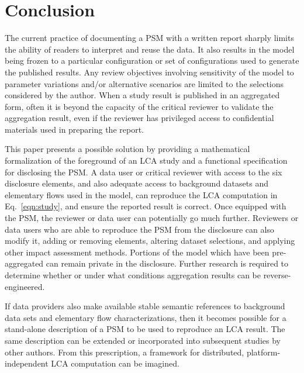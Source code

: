 \section{Conclusion} 

The current practice of documenting a PSM with a written report sharply limits the ability of readers to interpret and reuse the data.  It also results in the model being frozen to a particular configuration or set of configurations used to generate the published results.  Any review objectives involving sensitivity of the model to parameter variations and/or alternative scenarios are limited to the selections considered by the author.
When a study result is published in an aggregated form, often it is beyond the capacity of the critical reviewer to validate the aggregation result, even if the reviewer has privileged access to confidential materials used in preparing the report. 

This paper presents a possible solution by providing a mathematical formalization of the foreground of an LCA study and a functional specification for disclosing the PSM.  A data user or critical reviewer with access to the six disclosure elements, and also adequate access to background datasets and elementary flows used in the model, can reproduce the LCA computation in Eq.~\ref{eqn:study}, and ensure the reported result is correct.  Once equipped with the PSM, the reviewer or data user can potentially go much further.  Reviewers or data users who are able to reproduce the PSM from the disclosure can also modify it, adding or removing elements, altering dataset selections, and applying other impact assessment methods. Portions of the model which have been pre-aggregated can remain private in the disclosure. Further research is required to determine whether or under what conditions aggregation results can be reverse-engineered.

If data providers also make available stable semantic references to background data sets and elementary flow characterizations, then it becomes possible for a stand-alone description of a PSM to be used to reproduce an LCA result.  The same description can be extended or incorporated into subsequent studies by other authors. From this prescription, a framework for distributed, platform-independent LCA computation can be imagined.
